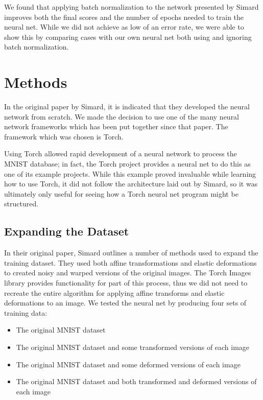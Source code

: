 \documentclass{article}
\begin{document}
We found that applying batch normalization to the network presented by Simard improves both the final scores and the number of epochs needed to train the neural net. While we did not achieve as low of an error rate, we were able to show this by comparing cases with our own neural net both using and ignoring batch normalization.

\section{Methods}
In the original paper by Simard, it is indicated that they developed the neural network from scratch. We made the decision to use one of the many neural network frameworks which has been put together since that paper. The framework which was chosen is Torch. 
\cite{torch}

Using Torch allowed rapid development of a neural network to process the MNIST database; in fact, the Torch project provides a neural net to do this as one of its example projects. While this example proved invaluable while learning how to use Torch, it did not follow the architecture laid out by Simard, so it was ultimately only useful for seeing how a Torch neural net program might be structured.

\subsection{Expanding the Dataset}
In their original paper, Simard outlines a number of methods used to expand the training dataset. They used both affine transformations and elastic deformations to created noisy and warped versions of the original images. The Torch Images library provides functionality for part of this process, thus we did not need to recreate the entire algorithm for applying affine transforms and elastic deformations to an image. We tested the neural net by producing four sets of training data:
\begin{itemize}
  \item The original MNIST dataset
  \item The original MNIST dataset and some transformed versions of each image
  \item The original MNIST dataset and some deformed versions of each image
  \item The original MNIST dataset and both transformed and deformed versions of each image
\end{itemize}
\end{document}
